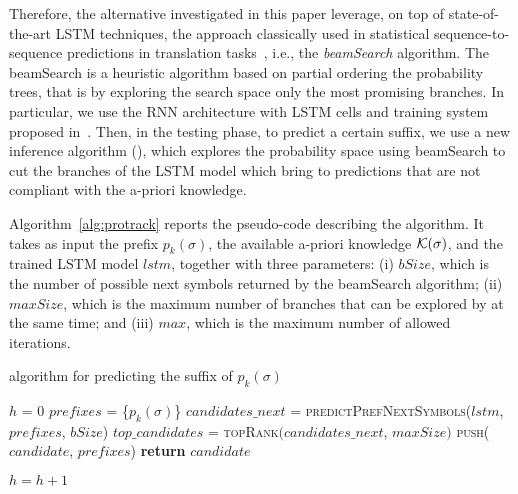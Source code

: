 Therefore, the alternative investigated in this paper leverage, on top of state-of-the-art LSTM techniques, the approach classically used in statistical sequence-to-sequence predictions in translation tasks~\cite{Tillmann2003WRD778822778827}, i.e., the \textit{beamSearch} algorithm. The beamSearch is a heuristic algorithm based on partial ordering the probability trees, that is by exploring the search space only the most promising branches.
In particular, we use the RNN architecture with LSTM cells and training system proposed in~\cite{niek96732}. Then, in the testing phase, to predict a certain suffix, we use a new inference algorithm (\protrack), which explores the probability space using beamSearch to cut the branches of the LSTM model which bring to predictions that are not compliant with the a-priori knowledge.

Algorithm~\ref{alg:protrack} reports the pseudo-code describing the \protrack algorithm. It takes as input the prefix $p_k(\sigma)$, the available a-priori knowledge $\cal{K}(\sigma)$, and the trained LSTM model $lstm$, together with three parameters: (i) $bSize$, which is the number of possible next symbols returned by the beamSearch algorithm; (ii) $maxSize$, which is the maximum number of branches that can be explored by \protrack at the same time; and (iii) $max$, which is the maximum number of allowed iterations.

\begin{algorithm}
	\caption{\protrack algorithm for predicting the suffix of $p_k(\sigma)$}
	\label{alg:protrack}
	\begin{algorithmic}[1]
		\State $h$ = 0
		\State $prefixes$ = \{$p_k(\sigma)$\}\label{lst2:initialization}
		 \label{lst2:while}
			\State $candidates\_next$ = \textsc{predictPrefNextSymbols}($lstm$, $prefixes$, $bSize$) \label{lst2:prediction}
			\State $top\_candidates$ = \textsc{topRank}$(candidates\_next$, $maxSize)$ \label{lst2:top}
			 \label{lst2:forall}
						\State \textsc{push}($candidate$, $prefixes$)
\Else
					 \label{lst2:compliant}
\State \textbf{return} $candidate$

\EndIf
				\EndIf
			\EndFor
			\State $h = h + 1$
		\EndWhile
		\EndFunction
	\end{algorithmic}
\end{algorithm}


